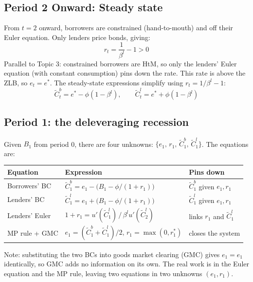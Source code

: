 \documentclass[11pt,a4paper]{article}
\begin{document}
\subsection{Period 2 Onward: Steady state}

From $t=2$ onward, borrowers are constrained (hand-to-mouth) and off their Euler equation. Only lenders price bonds, giving:
\begin{equation}
r_t = \frac{1}{\beta^l} - 1 > 0
\end{equation}
Parallel to Topic 3: constrained borrowers are HtM, so only the lenders' Euler equation (with constant consumption) pins down the rate. This rate is above the ZLB, so $e_t = e^*$. The steady-state expressions simplify using $r_t = 1/\beta^l - 1$:
\begin{equation}
\tilde{C}_t^b = e^* - \phi(1-\beta^l), \qquad \tilde{C}_t^l = e^* + \phi(1-\beta^l)
\end{equation}

\subsection{Period 1: the deleveraging recession}

Given $B_1$ from period 0, there are four unknowns: $\{e_1,\, r_1,\, \tilde{C}_1^b,\, \tilde{C}_1^l\}$. The equations are:

\begin{center}
\begin{tabular}{lll}
\toprule
Equation & Expression & Pins down \\
\midrule
Borrowers' BC & $\tilde{C}_1^b = e_1 - \bigl(B_1 - \phi/(1+r_1)\bigr)$ & $\tilde{C}_1^b$ given $e_1, r_1$ \\
Lenders' BC & $\tilde{C}_1^l = e_1 + \bigl(B_1 - \phi/(1+r_1)\bigr)$ & $\tilde{C}_1^l$ given $e_1, r_1$ \\
Lenders' Euler & $1+r_1 = u'(\tilde{C}_1^l)\,/\,\beta^l u'(\tilde{C}_2^l)$ & links $r_1$ and $\tilde{C}_1^l$ \\
MP rule + GMC & $e_1 = (\tilde{C}_1^b+\tilde{C}_1^l)/2$,\; $r_1 = \max(0,r_1^*)$ & closes the system \\
\bottomrule
\end{tabular}
\end{center}

Note: substituting the two BCs into goods market clearing (GMC) gives $e_1 = e_1$ identically, so GMC adds no information on its own. The real work is in the Euler equation and the MP rule, leaving two equations in two unknowns $(e_1, r_1)$.
\end{document}
